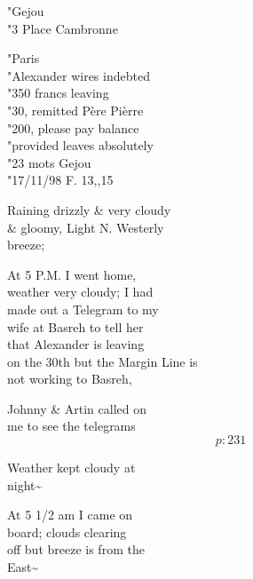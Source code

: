 \documentclass{report}
\begin{document}
	\par{
 	"Gejou\ \\"3 Place Cambronne\ \\
	}

	\par{
 	"Paris\ \\"Alexander wires indebted\ \\"350 francs leaving\ \\"30, remitted Père Pièrre\ \\"200, please pay balance\ \\"provided leaves absolutely\ \\"23 mots Gejou\ \\"17/11/98 F. 13,,15\ \\
	}

	\par{
 	Raining drizzly \& very cloudy\ \\\& gloomy, Light N. Westerly\ \\breeze;\ \\
	}

	\par{
 	At 5 P.M. I went home,\ \\weather very cloudy; I had\ \\made out a Telegram to my\ \\wife at Basreh to tell her\ \\that Alexander is leaving\ \\on the 30th but the Margin Line is\ \\not working to Basreh,\ \\
	}

	\par{
 	Johnny \& Artin called on\ \\me to see the telegrams\ \\
  \[p: 231 \]

	}







	\par{
 	Weather kept cloudy at\ \\night\~{}\ \\
	}

	\par{
 	At 5 1/2 am I came on\ \\board; clouds clearing\ \\off but breeze is from the\ \\East\~{}\ \\
	}
\end{document}
